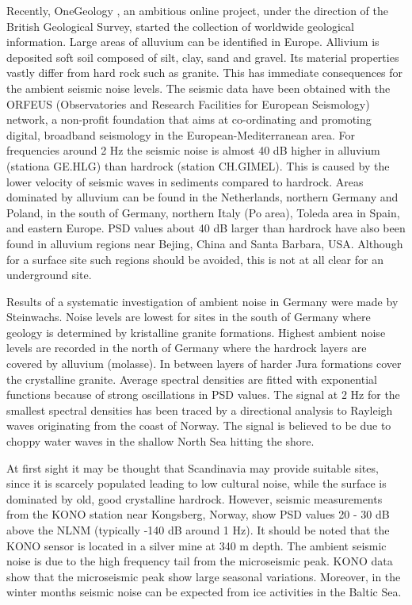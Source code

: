 \noindent
Recently, OneGeology \cite{onegeology}, an ambitious online project, under the direction of the British Geological Survey, started the collection of worldwide geological information. Large areas of alluvium can be identified in Europe. Allivium is deposited soft soil composed of silt, clay, sand and gravel. Its material properties vastly differ from hard rock such as granite. This has immediate consequences for the ambient seismic noise levels. The seismic data have been obtained with the ORFEUS (Observatories and Research Facilities for European Seismology) network, a non-profit foundation that aims at co-ordinating and promoting digital, broadband seismology in the European-Mediterranean area. For frequencies around 2 Hz the seismic noise is almost 40 dB higher in alluvium (stationa GE.HLG) than hardrock (station CH.GIMEL). This is caused by the lower velocity of seismic waves in sediments compared to hardrock. Areas dominated by alluvium can be found in the Netherlands, northern Germany and Poland, in the south of Germany, northern Italy (Po area), Toleda area in Spain, and eastern Europe. PSD values about 40 dB larger than hardrock have also been found in alluvium regions near Bejing, China and Santa Barbara, USA. Although for a surface site such regions should be avoided, this is not at all clear for an underground site.



\noindent
Results of a systematic investigation of ambient noise in Germany \cite{steinwachs} were made by Steinwachs. Noise levels are lowest for sites in the south of Germany where geology is determined by kristalline granite formations. Highest ambient noise levels are recorded in the north of Germany where the hardrock layers are covered by alluvium (molasse). In between layers of harder Jura formations cover the crystalline granite. Average spectral densities are fitted with exponential functions because of strong oscillations in PSD values. The signal at 2 Hz for the smallest spectral densities has been traced by a directional analysis to Rayleigh waves originating from the coast of Norway. The signal is believed to be due to choppy water waves in the shallow North Sea hitting the shore.

\noindent
At first sight it may be thought that Scandinavia may provide suitable sites, since it is scarcely populated leading to low cultural noise, while the surface is dominated by old, good crystalline hardrock. However, seismic measurements from the KONO station near Kongsberg, Norway, show PSD values 20 - 30 dB above the NLNM (typically -140 dB around 1 Hz). It should be noted that the KONO sensor is located in a silver mine at 340 m depth. The ambient seismic noise is due to the high frequency tail from the microseismic peak. KONO data show that the microseismic peak show large seasonal variations. Moreover, in the winter months seismic noise can be expected from ice activities in the Baltic Sea.


